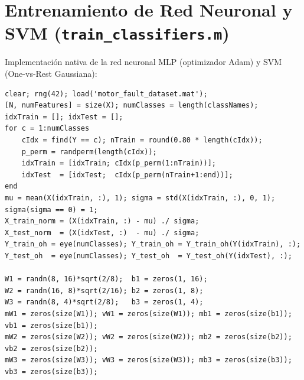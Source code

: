 \documentclass[conference]{IEEEtran}
\begin{document}
\newpage
\section{Entrenamiento de Red Neuronal y SVM (\texttt{train\_classifiers.m})}
\label{app:train}
Implementación nativa de la red neuronal MLP (optimizador Adam) y SVM (One-vs-Rest Gaussiana):
\begin{lstlisting}[caption={Entrenamiento de modelos supervisados (\texttt{train\_classifiers.m})}, label={lst:train}]
clear; rng(42); load('motor_fault_dataset.mat');
[N, numFeatures] = size(X); numClasses = length(classNames);
idxTrain = []; idxTest = [];
for c = 1:numClasses
    cIdx = find(Y == c); nTrain = round(0.80 * length(cIdx));
    p_perm = randperm(length(cIdx));
    idxTrain = [idxTrain; cIdx(p_perm(1:nTrain))];
    idxTest  = [idxTest;  cIdx(p_perm(nTrain+1:end))];
end
mu = mean(X(idxTrain, :), 1); sigma = std(X(idxTrain, :), 0, 1);
sigma(sigma == 0) = 1;
X_train_norm = (X(idxTrain, :) - mu) ./ sigma;
X_test_norm  = (X(idxTest, :)  - mu) ./ sigma;
Y_train_oh = eye(numClasses); Y_train_oh = Y_train_oh(Y(idxTrain), :);
Y_test_oh  = eye(numClasses); Y_test_oh  = Y_test_oh(Y(idxTest), :);

W1 = randn(8, 16)*sqrt(2/8);  b1 = zeros(1, 16);
W2 = randn(16, 8)*sqrt(2/16); b2 = zeros(1, 8);
W3 = randn(8, 4)*sqrt(2/8);   b3 = zeros(1, 4);
mW1 = zeros(size(W1)); vW1 = zeros(size(W1)); mb1 = zeros(size(b1)); vb1 = zeros(size(b1));
mW2 = zeros(size(W2)); vW2 = zeros(size(W2)); mb2 = zeros(size(b2)); vb2 = zeros(size(b2));
mW3 = zeros(size(W3)); vW3 = zeros(size(W3)); mb3 = zeros(size(b3)); vb3 = zeros(size(b3));


\end{lstlisting}
\end{document}
